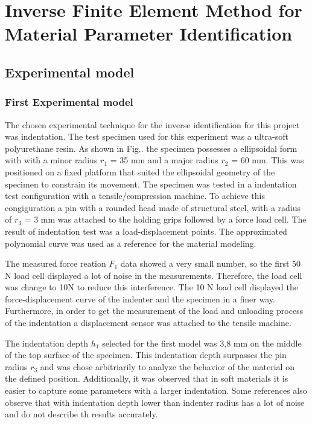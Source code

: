 
\chapter{Inverse Finite Element Method for Material Parameter Identification} %

\label{Chapter3} %

\section{Experimental model}

\subsection{First Experimental model}
The chosen experimental technique for the inverse identification for this project was indentation. 
The test specimen used for this experiment was a ultra-soft polyurethane resin. 
As shown in Fig.. the specimen possesses a ellipsoidal form with 
with a minor radius \(r_1\) = 35 mm and a major radius \(r_2\) = 60 mm. This was positioned
 on a fixed platform that suited the ellipsoidal geometry of the 
 specimen to constrain its movement. 
 The specimen was tested in a indentation test configuration with a tensile/compression machine.
 To achieve this congiguration a pin with a rounded head made of structural steel, 
 with a radius of \(r_3\) = 3 mm was attached 
 to the holding grips followed by a force load cell. 
The result of indentation test was a load-displacement points. The approximated 
polynomial curve was used as a reference for the material modeling.

 The measured force reation \(F_1\) data showed a very small number, so the 
 first 50 N load cell displayed a lot of noise in the measurements. 
 Therefore, the load cell was change to 10N to reduce this interference. 
The 10 N load cell displayed the force-displacement curve of the indenter and the specimen
 in a finer way. Furthermore, in order to get the measurement of the load and 
 unloading process of
 the indentation a displacement sensor was attached to the tensile machine.

 The indentation depth \(h_1\) selected for the first model was 3,8 mm on the middle of the 
 top surface of the specimen. This indentation depth surpasses the pin radius \(r_3\) and 
 was chose arbitriarily to analyze the behavior of the material on the defined position.
 Additionally, it was observed that in soft materials it is easier to capture 
 some parameters with a larger indentation. Some references also observe that with
 indentation depth lower than indenter radius has a lot of noise and do not describe
 th results accurately. %

